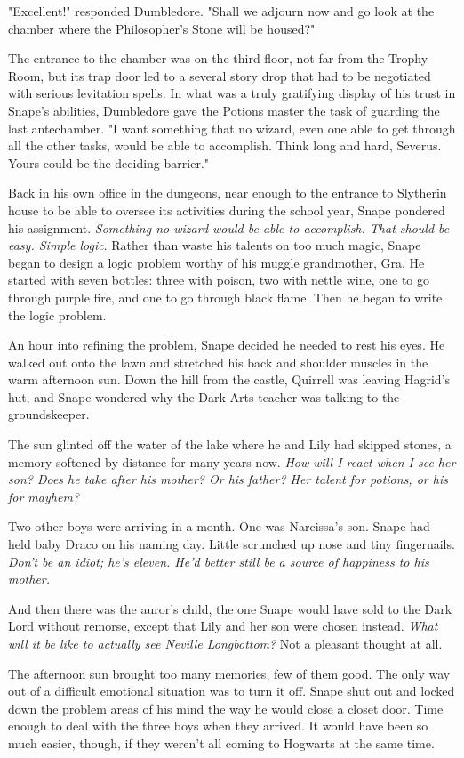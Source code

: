 "Excellent!" responded Dumbledore. "Shall we adjourn now and go look at the chamber where the Philosopher's Stone will be housed?"

The entrance to the chamber was on the third floor, not far from the Trophy Room, but its trap door led to a several story drop that had to be negotiated with serious levitation spells. In what was a truly gratifying display of his trust in Snape's abilities, Dumbledore gave the Potions master the task of guarding the last antechamber. "I want something that no wizard, even one able to get through all the other tasks, would be able to accomplish. Think long and hard, Severus. Yours could be the deciding barrier."

Back in his own office in the dungeons, near enough to the entrance to Slytherin house to be able to oversee its activities during the school year, Snape pondered his assignment. \emph{Something no wizard would be able to accomplish. That should be easy. Simple logic}. Rather than waste his talents on too much magic, Snape began to design a logic problem worthy of his muggle grandmother, Gra. He started with seven bottles: three with poison, two with nettle wine, one to go through purple fire, and one to go through black flame. Then he began to write the logic problem.

An hour into refining the problem, Snape decided he needed to rest his eyes. He walked out onto the lawn and stretched his back and shoulder muscles in the warm afternoon sun. Down the hill from the castle, Quirrell was leaving Hagrid's hut, and Snape wondered why the Dark Arts teacher was talking to the groundskeeper.

The sun glinted off the water of the lake where he and Lily had skipped stones, a memory softened by distance for many years now. \emph{How will I react when I see her son? Does he take after his mother? Or his father? Her talent for potions, or his for mayhem?}

Two other boys were arriving in a month. One was Narcissa's son. Snape had held baby Draco on his naming day. Little scrunched up nose and tiny fingernails. \emph{Don't be an idiot; he's eleven. He'd better still be a source of happiness to his mother.}

And then there was the auror's child, the one Snape would have sold to the Dark Lord without remorse, except that Lily and her son were chosen instead. \emph{What will it be like to actually see Neville Longbottom?} Not a pleasant thought at all.

The afternoon sun brought too many memories, few of them good. The only way out of a difficult emotional situation was to turn it off. Snape shut out and locked down the problem areas of his mind the way he would close a closet door. Time enough to deal with the three boys when they arrived. It would have been so much easier, though, if they weren't all coming to Hogwarts at the same time.

